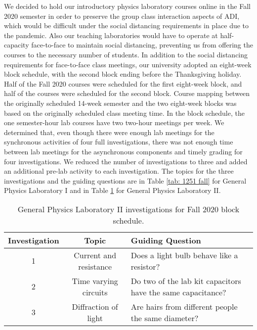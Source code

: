 \documentclass[aip, numerical, preprint]{revtex4-2}
\begin{document}
We decided to hold our introductory physics laboratory courses online in the Fall 2020 semester
in order to preserve the group class interaction aspects of ADI, which would be difficult under
the social distancing requirements in place due to the pandemic.\citep{mclber20} Also our
teaching laboratories would have to operate at half-capacity face-to-face to maintain social
distancing, preventing us from offering the courses to the necessary number of students.  In
addition to the social distancing requirements for face-to-face class meetings, our university
adopted an eight-week block schedule, with the second block ending before the Thanksgiving
holiday. Half of the Fall 2020 courses were scheduled for the first eight-week block, and half
of the courses were scheduled for the second block. Course mapping between the originally
scheduled 14-week semester and the two eight-week blocks was based on the originally scheduled
class meeting time. In the block schedule, the one semester-hour lab courses have two two-hour
meetings per week. We determined that, even though there were enough lab meetings for the
synchronous activities of four full investigations, there was not enough time between lab
meetings for the asynchronous components and timely grading for four investigations. We reduced
the number of investigations to three and added an additional pre-lab activity to each
investigation. The topics for the three investigations and the guiding questions are in Table
\ref{tab: 1251 fall} for General Physics Laboratory I and in Table \ref{tab: 1261 fall} for
General Physics Laboratory II.

\begin{table}
  \caption{\label{tab: 1261 fall} General Physics Laboratory II investigations for Fall 2020
    block schedule.}
  \begin{ruledtabular}
    \begin{tabular}{ccp{26em}}
      Investigation & Topic & Guiding Question\\
      \hline
      1 & Current and resistance & Does a light bulb behave like a resistor? \\
      2 & Time varying circuits & Do two of the lab kit capacitors have the same capacitance? \\
      3 & Diffraction of light & Are hairs from different people the same diameter?
    \end{tabular}
  \end{ruledtabular}
\end{table}
\end{document}
